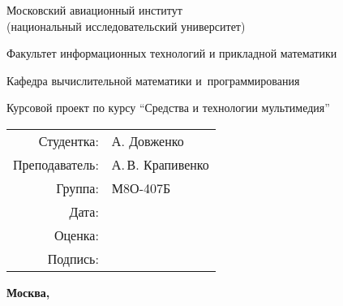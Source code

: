 \begin{titlepage}
\begin{center}
\bfseries

{\Large Московский авиационный институт\\ (национальный исследовательский университет)

}

\vspace{48pt}

{\large Факультет информационных технологий и прикладной математики
}

\vspace{36pt}


{\large Кафедра вычислительной математики и~программирования

}


\vspace{48pt}

Курсовой проект по курсу \enquote{Средства и технологии мультимедия}

\end{center}

\vspace{72pt}

\begin{flushright}
\begin{tabular}{rl}
Студентка: & А. Довженко \\
Преподаватель: & А.\,В. Крапивенко \\
Группа: & М8О-407Б \\
Дата: & \\
Оценка: & \\
Подпись: & \\
\end{tabular}
\end{flushright}

\vfill

\begin{center}
\bfseries
Москва, \the\year
\end{center}
\end{titlepage}

\pagebreak